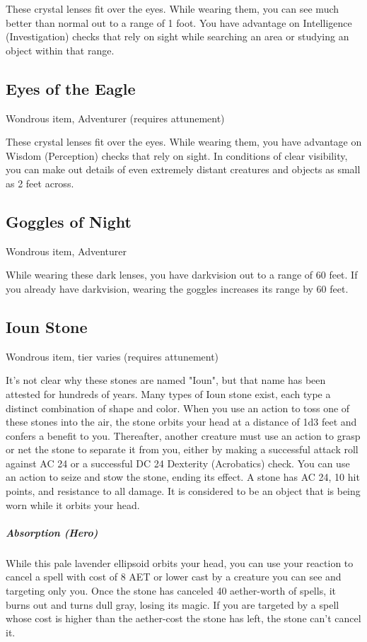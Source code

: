 These crystal lenses fit over the eyes. While wearing them, you can see much better than normal out to a range of 1 foot. You have advantage on Intelligence (Investigation) checks that rely on sight while searching an area or studying an object within that range.

\subsection{Eyes of the Eagle}
Wondrous item, Adventurer (requires attunement) 

These crystal lenses fit over the eyes. While wearing them, you have advantage on Wisdom (Perception) checks that rely on sight. In conditions of clear visibility, you can make out details of even extremely distant creatures and objects as small as 2 feet across.

\subsection{Goggles of Night}
Wondrous item, Adventurer 

While wearing these dark lenses, you have darkvision out to a range of 60 feet. If you already have darkvision, wearing the goggles increases its range by 60 feet.

\subsection{Ioun Stone}
Wondrous item, tier varies (requires attunement) 

It's not clear why these stones are named "Ioun", but that name has been attested for hundreds of years. Many types of Ioun stone exist, each type a distinct combination of shape and color. When you use an action to toss one of these stones into the air, the stone orbits your head at a distance of 1d3 feet and confers a benefit to you. Thereafter, another creature must use an action to grasp or net the stone to separate it from you, either by making a successful attack roll against AC 24 or a successful DC 24 Dexterity (Acrobatics) check. You can use an action to seize and stow the stone, ending its effect.  A stone has AC 24, 10 hit points, and resistance to all damage. It is considered to be an object that is being worn while it orbits your head.

\subparagraph*{Absorption (Hero)} While this pale lavender ellipsoid orbits your head, you can use your reaction to cancel a spell with cost of 8 AET or lower cast by a creature you can see and targeting only you.  Once the stone has canceled 40 aether-worth of spells, it burns out and turns dull gray, losing its magic. If you are targeted by a spell whose cost is higher than the aether-cost the stone has left, the stone can't cancel it.

